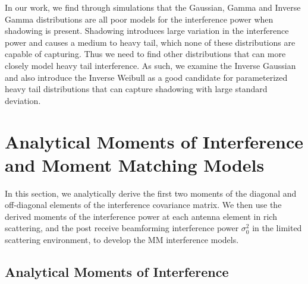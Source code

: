 \documentclass[12pt, draftclsnofoot, onecolumn]{IEEEtran}
\theoremstyle{plain}
\begin{document}
In our work, we find through simulations that the Gaussian, Gamma and Inverse Gamma distributions are all poor models for the interference power when shadowing is present. Shadowing introduces large variation in the interference power and causes a medium to heavy tail, which none of these distributions are capable of capturing. Thus we need to find other distributions that can more closely model heavy tail interference. As such, we examine the Inverse {Gaussian} and also introduce the Inverse Weibull as a good candidate for parameterized heavy tail distributions that can capture shadowing with large standard deviation.
%
\vspace{-0.1in}
\section{Analytical Moments of Interference and Moment Matching Models}\label{SecIV}
In this section, %
we analytically derive the first two moments of the diagonal and off-diagonal elements of the interference covariance matrix. We then use the derived moments of the interference power at each antenna element in rich scattering, and the post receive beamforming interference power $\sigma_0^2$ in the limited scattering environment, to develop the MM interference models.
\vspace{-.1in}
\subsection{Analytical Moments of Interference}\label{AnalyticMoments}
\vspace{-.1in}
\end{document}
